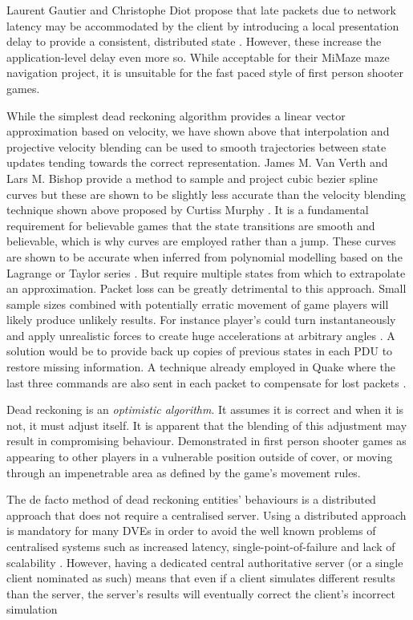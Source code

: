 \documentclass[journal]{IEEEtran}
\begin{document}
Laurent Gautier and Christophe Diot propose that late packets due to network latency may be accommodated by the client by introducing a local presentation delay to provide a consistent, distributed state \cite{gautier1998design}. However, these increase the application-level delay even more so. While acceptable for their MiMaze maze navigation project, it is unsuitable for the fast paced style of first person shooter games.

While the simplest dead reckoning algorithm provides a linear vector approximation based on velocity, we have shown above that interpolation and projective velocity blending can be used to smooth trajectories between state updates tending towards the correct representation. James M. Van Verth and Lars M. Bishop provide a method to sample and project cubic bezier spline curves \cite{van2008essential} but these are shown to be slightly less accurate than the velocity blending technique shown above proposed by Curtiss Murphy \cite{murphy2011believable}. It is a fundamental requirement for believable games that the state transitions are smooth and believable, which is why curves are employed rather than a jump. These curves are shown to be accurate when inferred from polynomial modelling based on the Lagrange or Taylor series \cite{hanawa2006proposal}. But require multiple states from which to extrapolate an approximation. Packet loss can be greatly detrimental to this approach. Small sample sizes combined with potentially erratic movement of game players will likely produce unlikely results. For instance player’s could turn instantaneously and apply unrealistic forces to create huge accelerations at arbitrary angles \cite{bernier2001latency}. A solution would be to provide back up copies of previous states in each PDU to restore missing information. A technique already employed in Quake where the last three commands are also sent in each packet to compensate for lost packets \cite{cronin2001distributed}.

Dead reckoning is an \textit{optimistic algorithm}. It assumes it is correct  and when it is not, it must adjust itself. It is apparent that the blending of this adjustment may result in compromising behaviour. Demonstrated in first person shooter games as appearing to other players in a vulnerable position outside of cover, or moving through an impenetrable area as defined by the game's movement rules.

The de facto method of dead reckoning entities' behaviours is a distributed approach that does not require a centralised server. Using a distributed approach is mandatory for many DVEs in order to avoid the well known problems of centralised systems such as increased latency, single-point-of-failure and lack of scalability \cite{mauve2000keep}. However, having a dedicated central authoritative server (or a single client nominated as such) means that even if a client simulates different results than the server, the server’s results will eventually correct the client’s incorrect simulation \cite{bernier2001latency}
\end{document}
